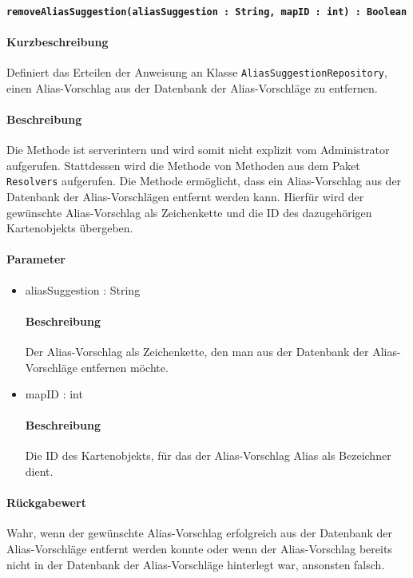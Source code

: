 \paragraph{\texttt{removeAliasSuggestion(aliasSuggestion : String, mapID : int) : Boolean}}%
\paragraph*{Kurzbeschreibung}
Definiert das Erteilen der Anweisung an Klasse \texttt{AliasSuggestionRepository}, einen Alias-Vorschlag aus der Datenbank der Alias-Vorschläge zu entfernen.
\paragraph*{Beschreibung}
Die Methode ist serverintern und wird somit nicht explizit vom Administrator aufgerufen.
Stattdessen wird die Methode von Methoden aus dem Paket \texttt{Resolvers} aufgerufen.
Die Methode ermöglicht, dass ein Alias-Vorschlag aus der Datenbank der Alias-Vorschlägen entfernt werden kann.
Hierfür wird der gewünschte Alias-Vorschlag als Zeichenkette und die ID des dazugehörigen Kartenobjekts übergeben.
\paragraph*{Parameter}
\begin{itemize}
    \item aliasSuggestion : String
    		\paragraph*{Beschreibung}
    		Der Alias-Vorschlag als Zeichenkette, den man aus der Datenbank der Alias-Vorschläge entfernen möchte.
    \item mapID : int
    		\paragraph*{Beschreibung}
    		Die ID des Kartenobjekts, für das der Alias-Vorschlag Alias als Bezeichner dient.
\end{itemize}
\paragraph*{Rückgabewert}
Wahr, wenn der gewünschte Alias-Vorschlag erfolgreich aus der Datenbank der Alias-Vorschläge entfernt werden konnte oder wenn der Alias-Vorschlag bereits nicht in der Datenbank der Alias-Vorschläge hinterlegt war, ansonsten falsch.
